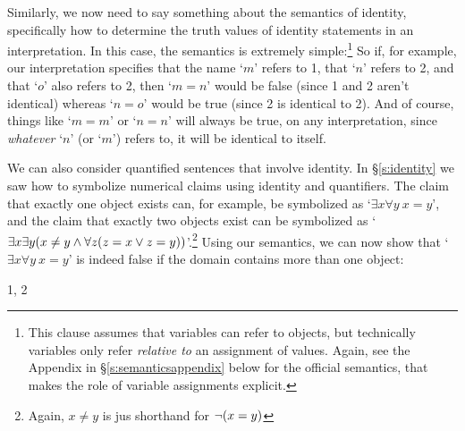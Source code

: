 Similarly, we now need to say something about the semantics of identity, specifically how to determine the truth values of identity statements in an interpretation.  In this case, the semantics is extremely simple:\footnote{This clause assumes that variables can refer to objects, but technically variables only refer \emph{relative to} an assignment of values.  Again, see the Appendix in \S\ref{s:semanticsappendix} below for the official semantics, that makes the role of variable assignments explicit.}
So if, for example, our interpretation specifies that the name `$m$' refers to 1, that `$n$' refers to 2, and that `$o$' also refers to 2, then `$m = n$' would be false (since 1 and 2 aren't identical) whereas `$n = o$' would be true (since 2 is identical to 2).  And of course, things like `$m = m$' or `$n = n$' will always be true, on any interpretation, since \emph{whatever} `$n$' (or `$m$') refers to, it will be identical to itself.

We can also consider quantified sentences that involve identity.  In \S\ref{s:identity} we saw how to symbolize numerical claims using identity and quantifiers.  The claim that exactly one object exists can, for example, be symbolized as `$\exists x \forall y \ x = y$', and the claim that exactly two objects exist can be symbolized as `$\exists x \exists y( x \neq y \wedge \forall z(z = x \vee z = y))$'.\footnote{Again, $x \neq y$ is jus shorthand for $\neg (x = y)$}   Using our semantics, we can now show that `$\exists x \forall y \ x = y$' is indeed false if the domain contains more than one object:

\begin{center}

\begin{ekey}
	\item[\text{Domain}] 1, 2
\end{ekey}
\end{center}

